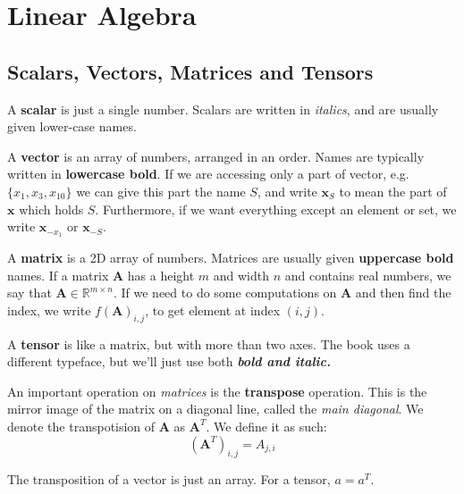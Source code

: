 \chapter{Linear Algebra}

\section{Scalars, Vectors, Matrices and Tensors}%
\label{sec:2.1}

A \textbf{scalar} is just a single number. Scalars are written in \textit{italics}, and are usually given lower-case names.

A \textbf{vector} is an array of numbers, arranged in an order. Names are typically written in \textbf{lowercase bold}. If we are accessing only a part of vector, e.g. $\{x_{1}, x_{3}, x_{10}\}$ we can give this part the name $S$, and write $\mathbf{x}_{S}$ to mean the part of $\mathbf{x}$ which holds $S$. Furthermore, if we want everything except an element or set, we write $\mathbf{x}_{-x_{1}}$ or $\mathbf{x}_{-S}$.

A \textbf{matrix} is a 2D array of numbers. Matrices are usually given \textbf{uppercase bold} names. If a matrix $\mathbf{A}$ has a height $m$ and width $n$ and contains real numbers, we say that $\mathbf{A} \in \mathbb{R}^{m \times n}$. If we need to do some computations on $\mathbf{A}$ and then find the index, we write $f(\mathbf{A})_{i,j}$, to get element at index $(i,j)$.

A \textbf{tensor} is like a matrix, but with more than two axes. The book uses a different typeface, but we'll just use both \textbf{\textit{bold and italic.}}

An important operation on \textit{matrices} is the \textbf{transpose} operation. This is the mirror image of the matrix on a diagonal line, called the \textit{main diagonal}. We denote the transpotision of $\mathbf{A}$ as $\mathbf{A}^{T}$. We define it as such:
\begin{equation*}
	(\mathbf{A}^{T})_{i,j} = A_{j,i}
\end{equation*}

The transposition of a vector is just an array. For a tensor, $a = a^{T}$.

